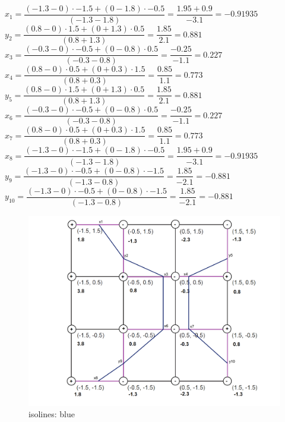 \documentclass[a4paper]{article}
\begin{document}
\begin{enumerate}
			$ x_{1} = \dfrac{(-1.3 - 0) \cdot -1.5 + (0 - 1.8) \cdot -0.5}{(-1.3 - 1.8)} = \dfrac{1.95 + 0.9}{-3.1} = -0.91935$\\ 
			
			$y_{2} = \dfrac{(0.8 - 0) \cdot 1.5 + (0 + 1.3) \cdot 0.5}{(0.8 + 1.3)} = \dfrac{1.85}{2.1} = 0.881$\\
			
			$x_{3} = \dfrac{(-0.3 - 0) \cdot -0.5 + (0 - 0.8) \cdot 0.5}{(-0.3 - 0.8)} = \dfrac{-0.25}{-1.1} = 0.227$\\
			
			$x_{4} = \dfrac{(0.8 - 0) \cdot 0.5 + (0 + 0.3) \cdot 1.5}{(0.8 + 0.3)} = \dfrac{0.85}{1.1} =  0.773 $\\ 
			
			$y_{5} = \dfrac{(0.8 - 0) \cdot 1.5 + (0 + 1.3) \cdot 0.5}{(0.8 + 1.3)} = \dfrac{1.85}{2.1} = 0.881$\\
			
			$x_{6} = \dfrac{(-0.3 - 0) \cdot -0.5 + (0 - 0.8) \cdot 0.5}{(-0.3 - 0.8)} = \dfrac{-0.25}{-1.1} = 0.227$\\
			
			$x_{7} = \dfrac{(0.8 - 0) \cdot 0.5 + (0 + 0.3) \cdot 1.5}{(0.8 + 0.3)} = \dfrac{0.85}{1.1} =  0.773 $\\ 
			
			$ x_{8} = \dfrac{(-1.3 - 0) \cdot -1.5 + (0 - 1.8) \cdot -0.5}{(-1.3 - 1.8)} = \dfrac{1.95 + 0.9}{-3.1} = -0.91935$\\ 
			
			$y_{9} = \dfrac{(-1.3 - 0) \cdot -0.5 + (0 - 0.8) \cdot -1.5}{(- 1.3 - 0.8)} = \dfrac{1.85}{- 2.1} = - 0.881$\\


			$y_{10} = \dfrac{(-1.3 - 0) \cdot -0.5 + (0 - 0.8) \cdot -1.5}{(- 1.3 - 0.8)} = \dfrac{1.85}{- 2.1} = - 0.881$\\	
			
					
			\begin{figure}[h!]
				\centering 
				\includegraphics[width=13cm]{7_2_2_2.pdf}
				\caption{isolines: blue}
				\label{}
			\end{figure}
			
\end{enumerate}
\end{document}
